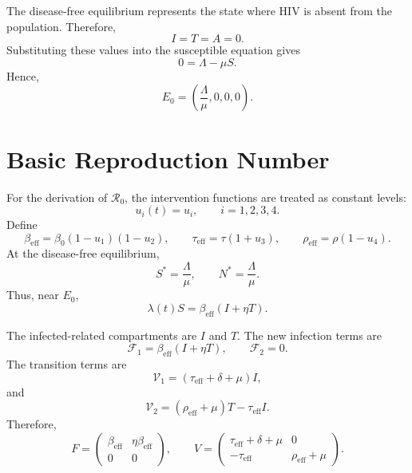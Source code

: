 \documentclass[12pt,a4paper,oneside]{report}
\newcommand{\Rzero}{\mathcal{R}_0}
\newcommand{\beff}{\beta_{\mathrm{eff}}}
\newcommand{\taueff}{\tau_{\mathrm{eff}}}
\newcommand{\rhoeff}{\rho_{\mathrm{eff}}}
\begin{document}
The disease-free equilibrium represents the state where HIV is absent from the population. Therefore,
\[
I=T=A=0.
\]
Substituting these values into the susceptible equation gives
\[
0=\Lambda-\mu S.
\]
Hence,
\begin{equation}
E_0=\left(\frac{\Lambda}{\mu},0,0,0\right).
\label{eq:dfe}
\end{equation}

\section{Basic Reproduction Number}

For the derivation of $\Rzero$, the intervention functions are treated as constant levels:
\[
u_i(t)=u_i,\qquad i=1,2,3,4.
\]
Define
\[
\beff=\beta_0(1-u_1)(1-u_2),\qquad
\taueff=\tau(1+u_3),\qquad
\rhoeff=\rho(1-u_4).
\]
At the disease-free equilibrium,
\[
S^*=\frac{\Lambda}{\mu},
\qquad
N^*=\frac{\Lambda}{\mu}.
\]
Thus, near $E_0$,
\[
\lambda(t)S
=
\beff(I+\eta T).
\]

The infected-related compartments are $I$ and $T$. The new infection terms are
\[
\mathcal{F}_1=\beff(I+\eta T),
\qquad
\mathcal{F}_2=0.
\]
The transition terms are
\[
\mathcal{V}_1=(\taueff+\delta+\mu)I,
\]
and
\[
\mathcal{V}_2=(\rhoeff+\mu)T-\taueff I.
\]
Therefore,
\[
F=
\begin{pmatrix}
\beff & \eta\beff\\
0&0
\end{pmatrix},
\qquad
V=
\begin{pmatrix}
\taueff+\delta+\mu & 0\\
-\taueff & \rhoeff+\mu
\end{pmatrix}.
\]
\end{document}
